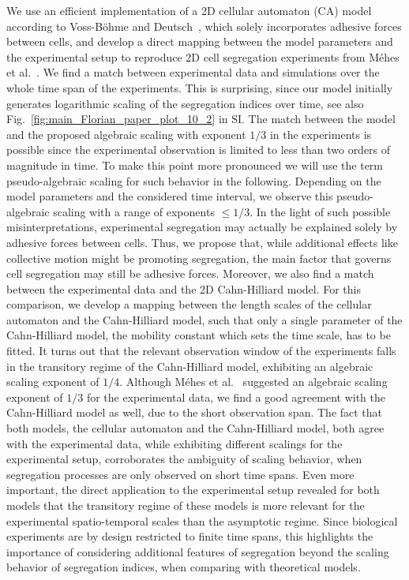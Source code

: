 \documentclass[10pt,letterpaper]{article}
\newcommand{\figref}[1]{Fig.~\ref{fig:#1}}
\begin{document}
We use an efficient implementation of a 2D cellular automaton (CA) model
according to Voss-B\"ohme and Deutsch~\cite{VosDeu2010}, which solely
incorporates adhesive forces between cells, and develop a direct
mapping between the model parameters and the experimental setup to
reproduce 2D cell segregation experiments from Méhes et
al.~\cite{MehMonNemVic2012}. We find a match between experimental data
and simulations over the whole time span of the experiments. This is
surprising, since our model initially generates logarithmic scaling of
the segregation indices over time, see also
\figref{main_Florian_paper_plot_10_2} in SI. The match between the
model and the proposed algebraic scaling with exponent $1/3$ in the
experiments is possible since the experimental observation is limited
to less than two orders of magnitude in time. To make this point more
pronounced we will use the term pseudo-algebraic scaling for such
behavior in the following. Depending on the model parameters and the
considered time interval, we observe this pseudo-algebraic scaling
with a range of exponents $\leq 1/3$. In the light of such possible
misinterpretations, experimental segregation may actually be explained
solely by adhesive forces between cells. Thus, we propose that, while
additional effects like collective motion might be promoting
segregation, the main factor that governs cell segregation may still be
adhesive forces. Moreover, we also find a match between the
experimental data and the 2D Cahn-Hilliard model. For this comparison, we
develop a mapping between the length scales of the cellular automaton
and the Cahn-Hilliard model, such that only a single parameter of the
Cahn-Hilliard model, the mobility constant which sets the time scale,
has to be fitted. It turns out that the relevant observation window
of the experiments falls in the transitory regime of the Cahn-Hilliard
model, exhibiting an algebraic scaling exponent of $1/4$. Although
Méhes et al.~\cite{MehMonNemVic2012} suggested an algebraic scaling
exponent of $1/3$ for the experimental data, we find a good agreement
with the Cahn-Hilliard model as well, due to the short observation
span. The fact that both models, the cellular automaton and the
Cahn-Hilliard model, both agree with the experimental data, while
exhibiting different scalings for the experimental setup, corroborates
the ambiguity of scaling behavior, when segregation processes are only
observed on short time spans. Even more important, the direct
application to the experimental setup revealed for both models that
the transitory regime of these models is more relevant for the
experimental spatio-temporal scales than the asymptotic regime. Since
biological experiments are by design restricted to finite time spans,
this highlights the importance of considering
additional features of segregation beyond the scaling behavior of
segregation indices, when comparing with theoretical models.
\end{document}
